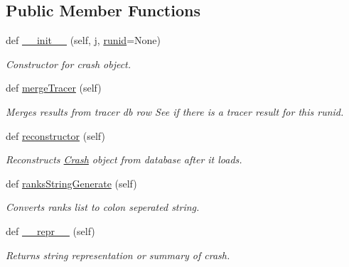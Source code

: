 \subsection*{Public Member Functions}
\begin{DoxyCompactItemize}
\item 
def \mbox{\hyperlink{classdb_1_1crash_1_1_crash_a942b4146c30dc12dd352b600a9f0a8ba}{\+\_\+\+\_\+init\+\_\+\+\_\+}} (self, j, \mbox{\hyperlink{classdb_1_1crash_1_1_crash_a004548b6df7b106228b71b27c1aa1b2d}{runid}}=None)
\begin{DoxyCompactList}\small\item\em Constructor for crash object. \end{DoxyCompactList}\item 
\mbox{\label{classdb_1_1crash_1_1_crash_ae8ce22a306bef78c6559bcc9341097f0}} 
def \mbox{\hyperlink{classdb_1_1crash_1_1_crash_ae8ce22a306bef78c6559bcc9341097f0}{merge\+Tracer}} (self)
\begin{DoxyCompactList}\small\item\em Merges results from tracer db row See if there is a tracer result for this runid. \end{DoxyCompactList}\item 
\mbox{\label{classdb_1_1crash_1_1_crash_a343c3d85ec8ea541aefe968022dab77d}} 
def \mbox{\hyperlink{classdb_1_1crash_1_1_crash_a343c3d85ec8ea541aefe968022dab77d}{reconstructor}} (self)
\begin{DoxyCompactList}\small\item\em Reconstructs \mbox{\hyperlink{classdb_1_1crash_1_1_crash}{Crash}} object from database after it loads. \end{DoxyCompactList}\item 
\mbox{\label{classdb_1_1crash_1_1_crash_aa2b33df8093f22bac652f8fa22249c2a}} 
def \mbox{\hyperlink{classdb_1_1crash_1_1_crash_aa2b33df8093f22bac652f8fa22249c2a}{ranks\+String\+Generate}} (self)
\begin{DoxyCompactList}\small\item\em Converts ranks list to colon seperated string. \end{DoxyCompactList}\item 
\mbox{\label{classdb_1_1crash_1_1_crash_af8b95e44e10b28a7e39464ef71290e3c}} 
def \mbox{\hyperlink{classdb_1_1crash_1_1_crash_af8b95e44e10b28a7e39464ef71290e3c}{\+\_\+\+\_\+repr\+\_\+\+\_\+}} (self)
\begin{DoxyCompactList}\small\item\em Returns string representation or summary of crash. \end{DoxyCompactList}\end{DoxyCompactItemize}

